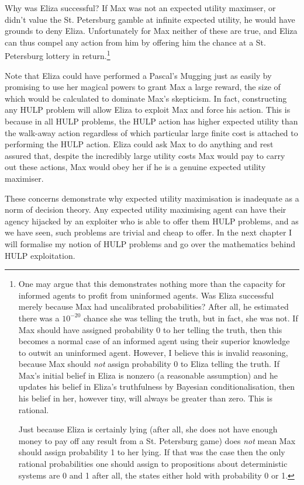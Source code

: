 \documentclass{article}
\begin{document}
Why was Eliza successful? If Max was not an expected utility maximser, or didn't value the St. Petersburg gamble at infinite expected utility, he would have grounds to deny Eliza. Unfortunately for Max neither of these are true, and Eliza can thus compel any action from him by offering him the chance at a St. Petersburg lottery in return.\footnote{One may argue that this demonstrates nothing more than the capacity for informed agents to profit from uninformed agents. Was Eliza successful merely because Max had uncalibrated probabilities? After all, he estimated there was a \(10^{-20}\) chance she was telling the truth, but in fact, she was not. If Max should have assigned probability 0 to her telling the truth, then this becomes a normal case of an informed agent using their superior knowledge to outwit an uninformed agent. However, I believe this is invalid reasoning, because Max should \textit{not} assign probability 0 to Eliza telling the truth. If Max's initial belief in Eliza is nonzero (a reasonable assumption) and he updates his belief in Eliza's truthfulness by Bayesian conditionalisation, then his belief in her, however tiny, will always be greater than zero. This is rational. 

Just because Eliza is certainly lying (after all, she does not have enough money to pay off any result from a St. Petersburg game) does \textit{not} mean Max should assign probability 1 to her lying. If that was the case then the only rational probabilities one should assign to propositions about deterministic systems are 0 and 1 \textemdash{} after all, the states either hold with probability 0 or 1.}

Note that Eliza could have performed a Pascal's Mugging just as easily by promising to use her magical powers to grant Max a large reward, the size of which would be calculated to dominate Max's skepticism. In fact, constructing any HULP problem will allow Eliza to exploit Max and force his action. This is because in all HULP problems, the HULP action has higher expected utility than the walk-away action regardless of which particular large finite cost is attached to performing the HULP action. Eliza could ask Max to do anything and rest assured that, despite the incredibly large utility costs Max would pay to carry out these actions, Max would obey her if he is a genuine expected utility maximiser.

These concerns demonstrate why expected utility maximisation is inadequate as a norm of decision theory. Any expected utility maximising agent can have their agency hijacked by an exploiter who is able to offer them HULP problems, and as we have seen, such problems are trivial and cheap to offer. In the next chapter I will formalise my notion of HULP problems and go over the mathematics behind HULP exploitation.
\end{document}
